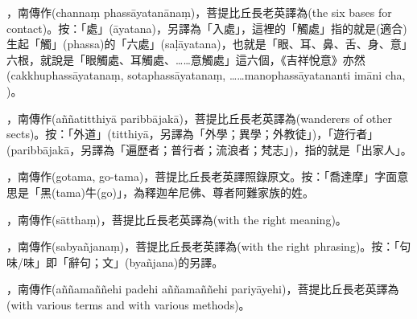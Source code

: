 \startitemgroup[noteitems]
\item{}，南傳作(channaṃ phassāyatanānaṃ)，菩提比丘長老英譯為(the six bases for contact)。按：「處」(āyatana)，另譯為「入處」，這裡的「觸處」指的就是(適合)生起「觸」(phassa)的「六處」(saḷāyatana)，也就是「眼、耳、鼻、舌、身、意」六根，就說是「眼觸處、耳觸處、……意觸處」這六個，《吉祥悅意》亦然(cakkhuphassāyatanaṃ, sotaphassāyatanaṃ, ……manophassāyatananti imāni cha, )。
\stopitemgroup

\startitemgroup[noteitems]
\item{}，南傳作(aññatitthiyā paribbājakā)，菩提比丘長老英譯為(wanderers of other sects)。按：「外道」(titthiyā，另譯為「外學；異學；外教徒」)，「遊行者」(paribbājakā，另譯為「遍歷者；普行者；流浪者；梵志」)，指的就是「出家人」。
\stopitemgroup

\startitemgroup[noteitems]
\item{}，南傳作(gotama, go-tama)，菩提比丘長老英譯照錄原文。按：「喬達摩」字面意思是「黑(tama)牛(go)」，為釋迦牟尼佛、尊者阿難家族的姓。
\stopitemgroup

\startitemgroup[noteitems]
\item{}，南傳作(sātthaṃ)，菩提比丘長老英譯為(with the right meaning)。
\stopitemgroup

\startitemgroup[noteitems]
\item{}，南傳作(sabyañjanaṃ)，菩提比丘長老英譯為(with the right phrasing)。按：「句味/味」即「辭句；文」(byañjana)的另譯。
\item{}，南傳作(aññamaññehi padehi aññamaññehi pariyāyehi)，菩提比丘長老英譯為(with various terms and with various methods)。
\stopitemgroup

